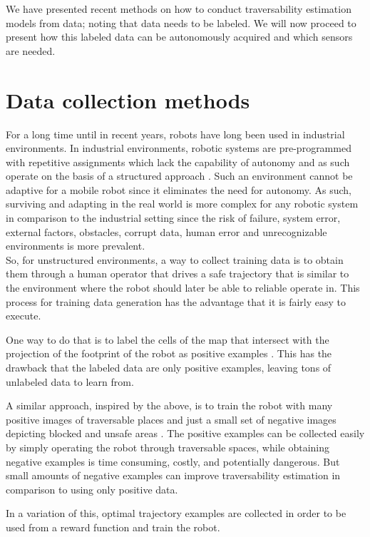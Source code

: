\documentclass[12pt,a4paper]{report}
\begin{document}
	
	We have presented recent methods on how to conduct traversability estimation 
	models from data; noting that data needs to be labeled. We will now proceed to 
	present how this labeled data can be autonomously acquired and which sensors are 
	needed.
	\\
	
	\section{Data collection methods}
	\label{sec:bg:data}
	
	For a long time until in recent years, robots have long been used in industrial 
	environments. In industrial environments, robotic systems are pre-programmed 
	with repetitive assignments which lack the capability of autonomy and as such 
	operate on the basis of a structured approach \citep{Shabbir}. Such an environment
	cannot be adaptive for a mobile robot since it eliminates the need for autonomy. 
	As such, surviving and adapting in the real world is more complex for any robotic
	system in comparison to the industrial setting since the risk of failure, system 
	error, external factors, obstacles, corrupt data, human error and unrecognizable 
	environments is more prevalent.
	\\
	
	So, for unstructured environments, a way to collect training data is to obtain 
	them through a human operator that drives a safe trajectory that is similar to 
	the environment where the robot should later be able to reliable operate in. 
	This process for training data generation has the advantage that it is fairly 
	easy to execute.
	\par 
	One way to do that is to label the cells of the map that intersect with the 
	projection of the footprint of the robot as positive examples \citep{Suger}. 
	This has the drawback that the labeled data are only positive examples, leaving 
	tons of unlabeled data to learn from.
	\par
	A similar approach, inspired by the above, is to train the robot with many 
	positive images of traversable places and just a small set of negative images 
	depicting blocked and unsafe areas \citep{HiroseGonet}. The positive examples can 
	be collected easily by simply operating the robot through traversable spaces, 
	while obtaining negative examples is time consuming, costly, and potentially 
	dangerous. But small amounts of negative examples can improve traversability 
	estimation in comparison to using only positive data.
	\par 
	In a variation of this, optimal trajectory examples are collected \citep{Wigness} 
	in order to be used from a reward function and train the robot.
	\\
	
\end{document}
